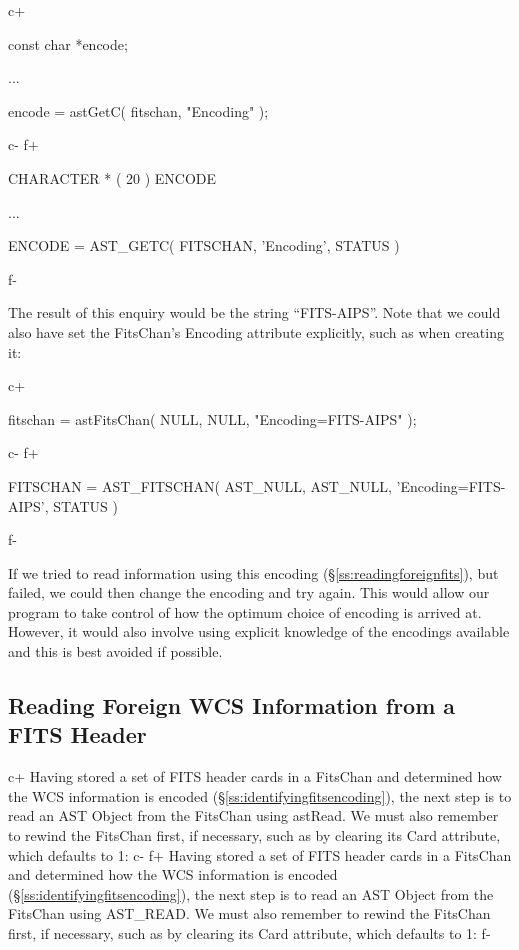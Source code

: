 \documentclass[twoside,11pt]{starlink}
\providecommand{\secref}[1]{\S\ref{#1}}
\begin{document}
c+
\small
\begin{terminalv}
const char *encode;

...


encode = astGetC( fitschan, "Encoding" );
\end{terminalv}
\normalsize
c-
f+
\small
\begin{terminalv}
      CHARACTER * ( 20 ) ENCODE

      ...

      ENCODE = AST_GETC( FITSCHAN, 'Encoding', STATUS )
\end{terminalv}
\normalsize
f-

The result of this enquiry would be the string ``FITS-AIPS''.  Note
that we could also have set the FitsChan's Encoding attribute
explicitly, such as when creating it:

c+
\small
\begin{terminalv}
fitschan = astFitsChan( NULL, NULL, "Encoding=FITS-AIPS" );
\end{terminalv}
\normalsize
c-
f+
\small
\begin{terminalv}
      FITSCHAN = AST_FITSCHAN( AST_NULL, AST_NULL, 'Encoding=FITS-AIPS', STATUS )
\end{terminalv}
\normalsize
f-

If we tried to read information using this encoding
(\secref{ss:readingforeignfits}), but failed, we could then change the
encoding and try again.  This would allow our program to take control
of how the optimum choice of encoding is arrived at. However, it would
also involve using explicit knowledge of the encodings available and
this is best avoided if possible.

\subsection{\label{ss:readingforeignfits}Reading Foreign WCS Information from a FITS Header}

c+
Having stored a set of FITS header cards in a FitsChan and determined
how the WCS information is encoded
(\secref{ss:identifyingfitsencoding}), the next step is to read an AST
Object from the FitsChan using astRead. We must also remember to
rewind the FitsChan first, if necessary, such as by clearing its Card
attribute, which defaults to 1:
c-
f+
Having stored a set of FITS header cards in a FitsChan and determined
how the WCS information is encoded
(\secref{ss:identifyingfitsencoding}), the next step is to read an AST
Object from the FitsChan using AST\_READ. We must also remember to
rewind the FitsChan first, if necessary, such as by clearing its Card
attribute, which defaults to 1:
f-
\end{document}
